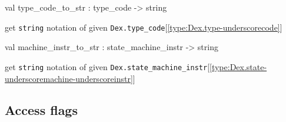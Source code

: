 \documentclass[11pt]{article}
\begin{document}
\label{val:Dex.type-underscorecode-underscoreto-underscorestr}\begin{ocamldoccode}
val type_code_to_str : type_code -> string
\end{ocamldoccode}
\begin{ocamldocdescription}
get {\tt{string}} notation of given {\tt{Dex.type\_code}}[\ref{type:Dex.type-underscorecode}]


\end{ocamldocdescription}




\label{val:Dex.machine-underscoreinstr-underscoreto-underscorestr}\begin{ocamldoccode}
val machine_instr_to_str : state_machine_instr -> string
\end{ocamldoccode}
\begin{ocamldocdescription}
get {\tt{string}} notation of given {\tt{Dex.state\_machine\_instr}}[\ref{type:Dex.state-underscoremachine-underscoreinstr}]


\end{ocamldocdescription}




\subsection{Access flags}
\end{document}
